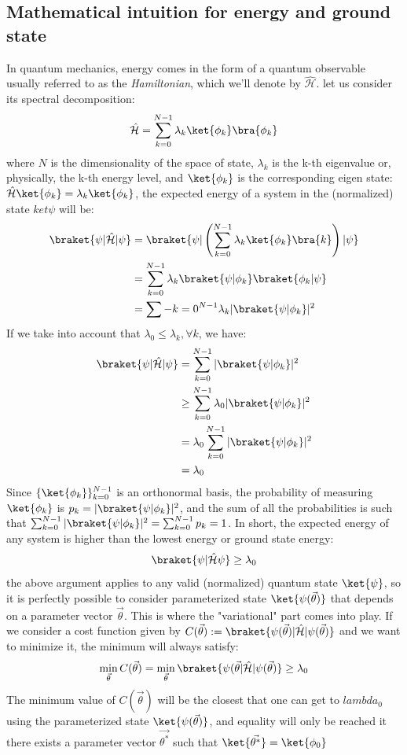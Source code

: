 \documentclass[12pt, oneside]{book}
\theoremstyle{definition}
\theoremstyle{definition}
\theoremstyle{remark}
\begin{document}
\subsection{Mathematical intuition for energy and ground state}
In quantum mechanics, energy comes in the form of a quantum observable usually referred to as the \textit{Hamiltonian}, which we'll denote by $\hat{\mathcal{H}}$. let us consider its spectral decomposition:
\[
\hat{\mathcal{H}}=\sum_{k=0}^{N-1} \lambda_k\ket{\phi_k}\bra{\phi_k}
\]
where $N$ is the dimensionality of the space of state, $\lambda_k$ is the k-th eigenvalue or, physically, the k-th energy level, and $\ket{\phi_k}$ is the corresponding eigen state: $\hat{\mathcal{H}}\ket{\phi_k}=\lambda_k\ket{\phi_k}$, the expected energy of a system in the (normalized) state $ket{\psi}$ will be:
\begin{align*}
\braket{\psi|\hat{\mathcal{H}}|\psi}&=\braket{\psi|\left(\sum_{k=0}^{N-1}\lambda_k\ket{\phi_k}\bra{k}\right)|\psi}\\
&=\sum_{k=0}^{N-1}\lambda_k\braket{\psi|\phi_k}\braket{\phi_k|\psi}\\
&=\sum-{k=0}^{N-1}\lambda_k|\braket{\psi|\phi_k}|^2
\end{align*}
If we take into account that $\lambda_0\leq\lambda_k, \forall k$, we have:
\begin{align*}
    \braket{\psi|\hat{\mathcal{H}}|\psi}&=\sum_{k=0}^{N-1}|\braket{\psi|\phi_k}|^2\\
    &\geq \sum_{k=0}^{N-1} \lambda_0|\braket{\psi|\phi_k}|^2\\
    &=\lambda_0\sum_{k=0}^{N-1}|\braket{\psi|\phi_k}|^2\\
    &=\lambda_0
\end{align*}
Since $\{\ket{\phi_k}\}_{k=0}^{N-1}$ is an orthonormal basis, the probability of measuring $\ket{\phi_k}$ is $p_k=|\braket{\psi|\phi_k}|^2$, and the sum of all the probabilities is such that $\sum_{k=0}^{N-1}|\braket{\psi|\phi_k}|^2=\sum_{k=0}^{N-1}p_k=1$. In short, the expected energy of any system is higher than the lowest energy or ground state energy:
\[
\braket{\psi|\hat{\mathcal{H}}\psi}\geq \lambda_0
\]
the above argument applies to any valid (normalized) quantum state $\ket{\psi}$, so it is perfectly possible to consider parameterized state $\ket{\psi(\vec{\theta})}$ that depends on a parameter vector $\vec{\theta}$. This is where the "variational" part comes into play. If we consider a cost function given by $C(\vec{\theta}):=\braket{\psi(\vec{\theta})|\hat{\mathcal{H}}|\psi(\vec{\theta})}$ and we want to minimize it, the minimum will always satisfy:
\[
\min_{\vec{\theta}}C(\vec{\theta}) = \min_{\vec{\theta}} \braket{\psi(\vec{\theta}|\hat{\mathcal{H}}|\psi(\vec{\theta})}\geq \lambda_0
\]
The minimum value of $C(\vec{\theta})$ will be the closest that one can get to $lambda_0$ using the parameterized state $\ket{\psi(\vec{\theta})}$, and equality will only be reached it there exists a parameter vector $\vec{\theta^*}$ such that $\ket{\vec{\theta^*}}=\ket{\phi_0}$
\end{document}
